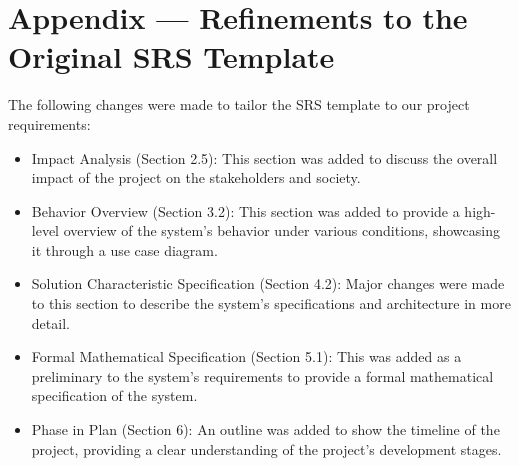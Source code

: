 \documentclass[12pt]{article}
\begin{document}
\section*{Appendix --- Refinements to the Original SRS Template}
The following changes were made to tailor the SRS template to our project requirements:
\begin{itemize}
  \item Impact Analysis (Section 2.5): This section was added to discuss the overall impact of the project on the stakeholders and society.
  \item Behavior Overview (Section 3.2): This section was added to provide a high-level overview of the system's behavior under various conditions, showcasing it through a use case diagram.
  \item Solution Characteristic Specification (Section 4.2): Major changes were made to this section to describe the system's specifications and architecture in more detail.
  \item Formal Mathematical Specification (Section 5.1): This was added as a preliminary to the system's requirements to provide a formal mathematical specification of the system.
  \item Phase in Plan (Section 6): An outline was added to show the timeline of the project, providing a clear understanding of the project's development stages.
\end{itemize}
\end{document}
